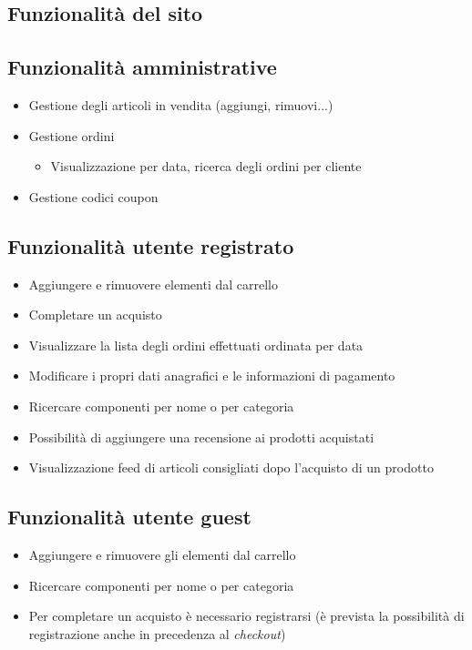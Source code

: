\documentclass{article}
\begin{document}
\begin{large}
\section{Funzionalità del sito}
\subsection{Funzionalità amministrative}
\begin{itemize}
    \item Gestione degli articoli in vendita (aggiungi, rimuovi...)
    \item Gestione ordini
    \begin{itemize}
        \item Visualizzazione per data, ricerca degli ordini per cliente
    \end{itemize}
    \item Gestione codici coupon
\end{itemize}
\subsection{Funzionalità utente registrato}
    \begin{itemize}
        \item Aggiungere e rimuovere elementi dal carrello
        \item Completare un acquisto
        \item Visualizzare la lista degli ordini effettuati ordinata per data
        \item Modificare i propri dati anagrafici e le informazioni di pagamento
        \item Ricercare componenti per nome o per categoria
        \item Possibilità di aggiungere una recensione ai prodotti acquistati
        \item Visualizzazione feed di articoli consigliati dopo l'acquisto di un prodotto
        \end{itemize}
\subsection{Funzionalità utente guest}
    \begin{itemize}
        \item Aggiungere e rimuovere gli elementi dal carrello
        \item Ricercare componenti per nome o per categoria
        \item Per completare un acquisto è necessario registrarsi (è prevista la possibilità di registrazione anche in precedenza al \textit{checkout})
    \end{itemize}

\end{large}
\end{document}
